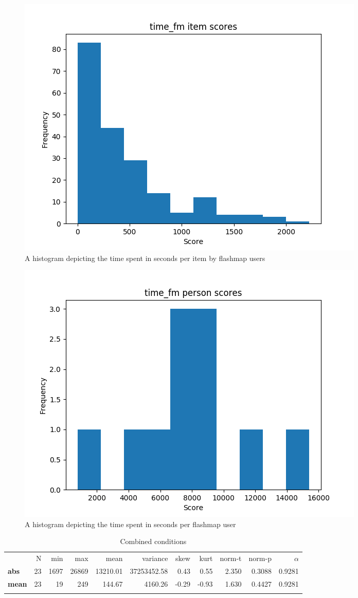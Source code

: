 \begin{figure}
    \centering
    \includegraphics[width=.7\textwidth]{img/time_fm_diff.png}
    \caption{A histogram depicting the time spent in seconds per item by flashmap users} 
    \label{fig:time_fm_diff}
\end{figure}
\begin{figure}
    \centering
    \includegraphics[width=.7\textwidth]{img/time_fm_abil.png}
    \caption{A histogram depicting the time spent in seconds per flashmap user}
    \label{fig:time_fm_abil}
\end{figure}

\begin{longtable}[c]{@{}lrrrrrrrrrr@{}}
\caption{Combined conditions}
\endfirsthead
\toprule\addlinespace
& N & min & max & mean & variance & skew & kurt & norm-t &
norm-p & $\alpha$
\\\addlinespace
\midrule
\textbf{abs} & 23 & 1697 & 26869 & 13210.01 & 37253452.58 & 0.43 & 0.55
& 2.350 & 0.3088 & 0.9281
\\\addlinespace
\textbf{mean} & 23 & 19 & 249 & 144.67 & 4160.26 & -0.29 & -0.93 & 1.630
& 0.4427 & 0.9281
\\\addlinespace
\bottomrule
    \label{tab:time_gen}
\end{longtable}

